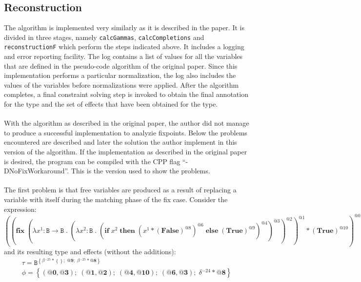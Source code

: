 \documentclass[8pt]{extarticle}
\begin{document}
\subsection{Reconstruction}
The algorithm is implemented very similarly as it is described in the paper. It is divided in three stages, namely \verb+calcGammas+, \verb+calcCompletions+ and \verb+reconstructionF+ which perform the steps indicated above. It includes a logging and error reporting facility. The log contains a list of values for all the variables that are defined in the pseudo-code algorithm of the original paper. Since this implementation performs a particular normalization, the log also includes the values of the variables before normalizations were applied. After the algorithm completes, a final constraint solving step is invoked to obtain the final annotation for the type and the set of effects that have been obtained for the type.
\\\\
With the algorithm as described in the original paper, the author did not manage to produce a successful implementation to analyzie fixpoints. Below the problems encountered are described and later the solution the author implement in this version of the algorithm. If the implementation as described in the original paper is desired, the program can be compiled with the CPP flag ``-DNoFixWorkaround''. This is the version used to show the problems.
\\\\
The first problem is that free variables are produced as a result of replacing a variable with itself during the matching phase of the fix case. Consider the expression:
\[
\left(\left(\mathbf{fix}\;{}\left(\lambda{}x^{1}:\mathtt{B}\to{}\mathtt{B}\;{}.\;{}\left(\lambda{}x^{2}:\mathtt{B}\;{}.\;{}\left(\mathbf{if}\;{}x^{2}\;{}\mathbf{then}\;{}\left(x^{1}*\left(\mathbf{False}\right)^{\mathit{@8}}\right)^{\mathit{@6}}\;{}\mathbf{else}\;{}\left(\mathbf{True}\right)^{\mathit{@9}}\right)^{\mathit{@4}}\right)^{\mathit{@3}}\right)^{\mathit{@2}}\right)^{\mathit{@1}}*\left(\mathbf{True}\right)^{\mathit{@10}}\right)^{\mathit{@0}}
\]
and its resulting type and effects (without the additions):
\[
\begin{array}{c}
\tau=\mathtt{B}^{\left\{\beta{}^{-25}*\left\{\right\};\;{}\textbf{@9};\;{}\beta{}^{-25}*\textbf{@8}\right\}} \\
\phi=\left\{\left(\textbf{@0},\textbf{@3}\right);\;{}\left(\textbf{@1},\textbf{@2}\right);\;{}\left(\textbf{@4},\textbf{@10}\right);\;{}\left(\textbf{@6},\textbf{@3}\right);\;{}\delta{}^{-24}*\textbf{@8}\right\}
\end{array}
\]
\end{document}
